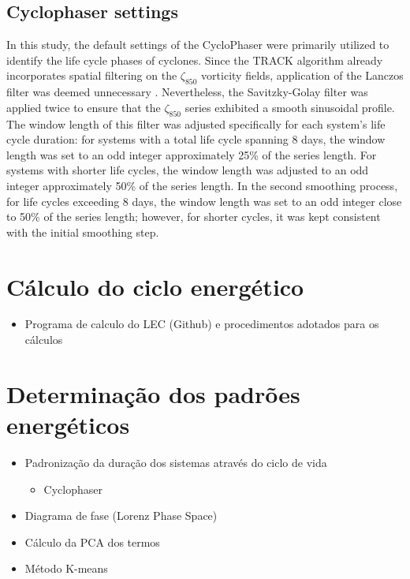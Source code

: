 \subsection{Cyclophaser settings} \label{sec:cyclophaser_settings}

In this study, the default settings of the CycloPhaser were primarily utilized to identify the life cycle phases of cyclones. Since the TRACK algorithm already incorporates spatial filtering on the \(\zeta_{850}\) vorticity fields, application of the Lanczos filter was deemed unnecessary \citep{hodges1994general, hodges1995feature}. Nevertheless, the Savitzky-Golay filter was applied twice to ensure that the \(\zeta_{850}\) series exhibited a smooth sinusoidal profile. The window length of this filter was adjusted specifically for each system's life cycle duration: for systems with a total life cycle spanning 8 days, the window length was set to an odd integer approximately 25\% of the series length. For systems with shorter life cycles, the window length was adjusted to an odd integer approximately 50\% of the series length. In the second smoothing process, for life cycles exceeding 8 days, the window length was set to an odd integer close to 50\% of the series length; however, for shorter cycles, it was kept consistent with the initial smoothing step.


\section{Cálculo do ciclo energético}\label{metodos_calculo_lec}

\begin{itemize}
    \item Programa de calculo do LEC (Github) e procedimentos adotados para os cálculos
\end{itemize}

\section{Determinação dos padrões energéticos}

\begin{itemize}
    \item Padronização da duração dos sistemas através do ciclo de vida
    \begin{itemize}
        \item Cyclophaser
    \end{itemize}
    \item Diagrama de fase (Lorenz Phase Space)
    \item Cálculo da PCA dos termos
    \item Método K-means

\end{itemize}

